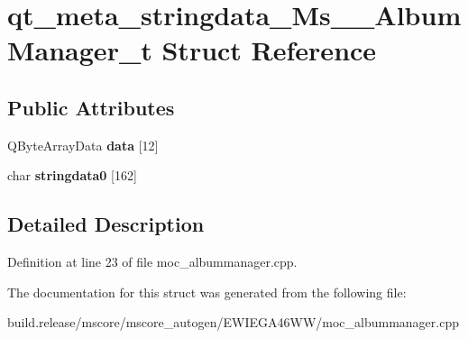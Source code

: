 \hypertarget{structqt__meta__stringdata___ms_____album_manager__t}{}\section{qt\+\_\+meta\+\_\+stringdata\+\_\+\+Ms\+\_\+\+\_\+\+Album\+Manager\+\_\+t Struct Reference}
\label{structqt__meta__stringdata___ms_____album_manager__t}
\subsection*{Public Attributes}
\begin{DoxyCompactItemize}
\item 
\mbox{\label{structqt__meta__stringdata___ms_____album_manager__t_a491018acaecd79c4745dd0cc312bbd7f}} 
Q\+Byte\+Array\+Data {\bfseries data} \mbox{[}12\mbox{]}
\item 
\mbox{\label{structqt__meta__stringdata___ms_____album_manager__t_a236fe5ee9b20d5951421e988738660de}} 
char {\bfseries stringdata0} \mbox{[}162\mbox{]}
\end{DoxyCompactItemize}


\subsection{Detailed Description}


Definition at line 23 of file moc\+\_\+albummanager.\+cpp.



The documentation for this struct was generated from the following file\+:\begin{DoxyCompactItemize}
\item 
build.\+release/mscore/mscore\+\_\+autogen/\+E\+W\+I\+E\+G\+A46\+W\+W/moc\+\_\+albummanager.\+cpp\end{DoxyCompactItemize}
